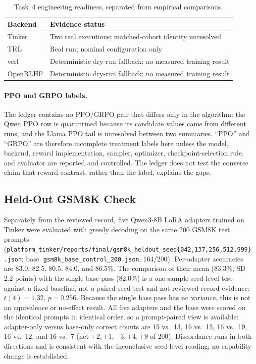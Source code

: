 \documentclass{article}
\begin{document}
\begin{table}[htbp]
\centering
\caption{Task~4 engineering readiness, separated from empirical comparisons.}
\label{tab:framework-readiness}
\small
\begin{tabular}{ll}
\toprule
Backend & Evidence status \\
\midrule
Tinker & Two real executions; matched-cohort identity unresolved \\
TRL & Real run; nominal configuration only \\
verl & Deterministic dry-run fallback; no measured training result \\
OpenRLHF & Deterministic dry-run fallback; no measured training result \\
\bottomrule
\end{tabular}
\end{table}

\paragraph{PPO and GRPO labels.}
The ledger contains no PPO/GRPO pair that differs only in the algorithm: the
Qwen PPO row is quarantined because its candidate values came from different
runs, and the Llama PPO tail is unresolved between two summaries. ``PPO'' and
``GRPO'' are therefore incomplete treatment labels here unless the model,
backend, reward implementation, sampler, optimizer, checkpoint-selection rule,
and evaluator are reported and controlled. The ledger does not test the
converse claim that reward contrast, rather than the label, explains the gaps.

\subsection{Held-Out GSM8K Check}
\label{sec:heldout}
Separately from the reviewed record, five Qwen3-8B LoRA adapters trained on
Tinker were evaluated with greedy decoding on the same 200 GSM8K test
prompts
(\texttt{platform\_tinker/reports/final/gsm8k\_heldout\_seed\{042,137,256,512,999\}.json};
base: \texttt{gsm8k\_base\_control\_200.json}, 164/200). Per-adapter accuracies
are 83.0, 82.5, 80.5, 84.0, and 86.5\%. The comparison of their mean (83.3\%,
SD 2.2 points) with the single base pass (82.0\%) is a one-sample seed-level
test against a fixed baseline, not a paired-seed test and not reviewed-record
evidence: $t(4)=1.32$, $p=0.256$. Because the single base pass has no variance,
this is not an equivalence or no-effect result. All five adapters and the base
were scored on the identical prompts in identical order, so a prompt-paired
view is available: adapter-only versus base-only correct counts are 15 vs.~13,
16 vs.~15, 16 vs.~19, 16 vs.~12, and 16 vs.~7 (net $+2,+1,-3,+4,+9$ of 200).
Discordance runs in both directions and is consistent with the inconclusive
seed-level reading; no capability change is established.
\end{document}
